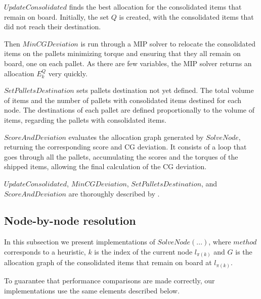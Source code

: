 \documentclass[preprint,authoryear]{elsarticle}
\begin{document}
$UpdateConsolidated$ finds the best allocation for the consolidated items that remain on board. Initially, the set $Q$ is created, with the consolidated items that did not reach their destination.

Then $MinCGDeviation$ is run through a MIP solver to relocate the consolidated items on the pallets minimizing torque and ensuring that they all remain on board, one on each pallet. As there are few variables, the MIP solver returns an allocation $E^Q_k$ very quickly.

$SetPalletsDestination$ sets pallets destination not yet defined. The total volume of items and the number of pallets with consolidated items destined for each node. The destinations of each pallet are defined proportionally to the volume of items, regarding the pallets with consolidated items.

$ScoreAndDeviation$ evaluates the allocation graph generated by $SolveNode$, returning the corresponding score and CG deviation. It consists of a loop that goes through all the pallets, accumulating the scores and the torques of the shipped items, allowing the final calculation of the CG deviation.

$UpdateConsolidated$, $MinCGDeviation$, $SetPalletsDestination$, and $ScoreAndDeviation$ are thoroughly described by \cite{MesquitaSanches2023}.


\subsection{Node-by-node resolution}
\label{methods}


In this subsection we present implementations of $SolveNode(...)$, where $method$\/ corresponds to a heuristic, $k$\/ is the index of the current node $l_{\pi(k)}$ and $G$\/ is the allocation graph of the consolidated items that remain on board at $l_{\pi(k)}$.

To guarantee that performance comparisons are made correctly, our implementations use the same elements described below.

\end{document}
